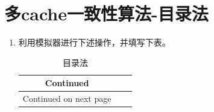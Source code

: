 \documentclass{ctexart}
\begin{document}
\section{\hei 多cache一致性算法-目录法}
\begin{enumerate}
    \item 利用模拟器进行下述操作，并填写下表。
    \begin{longtable}{|l|l|l|}

        \caption{目录法}\label{tab2}


        \endfirsthead

        \multicolumn{1}{c}{Continued}                   \\

        \endhead


        \multicolumn{1}{c}{Continued on next page}
        \endfoot



\end{longtable}
\end{enumerate}
\end{document}
